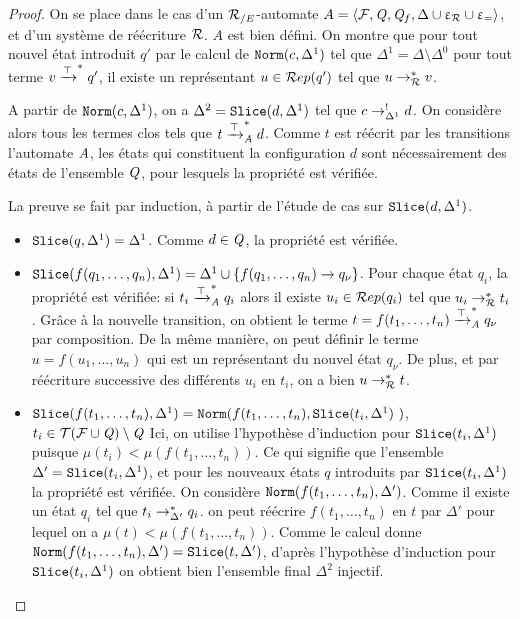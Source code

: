 \begin{proof}
  On se place dans le cas d'un ${\mathcal R_{/E}}$-automate $A = \langle \mathcal{F}, \mathit Q, \mathit Q_f, \Delta \cup \upvarepsilon_{\mathcal R} \cup \upvarepsilon_{=}\rangle$, et d'un système de réécriture $\mathcal R$.
  $A$ est bien défini.
  On montre que pour tout nouvel état introduit $q'$  par le calcul de $\mathtt{Norm}(c, \Delta^1)$ tel que $\Delta^1 = \Delta \setminus \Delta^0$
  pour tout terme $v \xrightarrow{\top}^* q'$, il existe un représentant $u \in \mathcal R ep(q')$ tel que $u \rightarrow^*_\mathcal R v$.

  A partir de $\mathtt{Norm}(c, \Delta^1)$, on a $\Delta^2 = \mathtt{Slice}(d, \Delta^1)$ tel que $c \rightarrow^!_{\Delta^1} d$.
  On considère alors tous les termes clos tels que $t \xrightarrow{\top}^*_\mathit A d$. Comme $t$ est réécrit par les transitions 
  l'automate $\mathit A$, les états qui constituent la configuration $d$ sont nécessairement des états de l'ensemble $\mathit Q$,
  pour lesquels la propriété est vérifiée.
  
  La preuve se fait par induction, à partir de l'étude de cas sur $\mathtt{Slice}(d, \Delta^1)$. 
  \begin{itemize}
  \item $\mathtt{Slice}(q, \Delta^1) = \Delta^1$. Comme $d \in \mathit Q$, la propriété est vérifiée.

  \item $\mathtt{Slice}(f(q_1, \dots, q_n), \Delta^1) = \Delta^1 \cup \{ f(q_1, \dots, q_n) \rightarrow q_\nu\}$. 
    Pour chaque état $q_i$, la propriété est vérifiée: si $t_i \xrightarrow{\top}^*_\mathit A q_i$ alors il existe $u_i \in \mathcal R ep(q_i)$
    tel que $u_i \rightarrow_\mathcal R^* t_i$. Grâce à la nouvelle transition, on obtient le terme $t = f(t_1, \dots, t_n) \xrightarrow{\top}^*_\mathit A q_\nu$ par composition.
    De la même manière, on peut définir le terme $u = f(u_1, \dots, u_n)$ qui est un représentant du nouvel état $q_\nu$.
    De plus, et par réécriture successive des différents $u_i$ en $t_i$, on a bien $u \rightarrow^*_\mathcal R t$.

  \item $\mathtt{Slice}(f(t_1, \dots, t_n), \Delta^1) = \mathtt{Norm}(f(t_1,\dots, t_n), \mathtt{Slice}(t_i, \Delta^1)\ )$, $t_i \in \mathcal{ T(F \cup \mathit Q)} \setminus \mathit Q$
    Ici, on utilise l'hypothèse d'induction pour $\mathtt{Slice}(t_i, \Delta^1)$ puisque $\mu (t_i) < \mu(f(t_1, \dots, t_n))$.
    Ce qui signifie que l'ensemble $\Delta' = \mathtt{Slice}(t_i, \Delta^1)$, et pour les nouveaux états $q$ introduits par $\mathtt{Slice}(t_i, \Delta^1)$
    la propriété est vérifiée.
    On considère $\mathtt{Norm}(f(t_1,\dots, t_n), \Delta')$. Comme il existe un état $q_i$ tel que $t_i \rightarrow^*_{\Delta'} q_i$. on peut 
    réécrire $f(t_1,\dots, t_n)$ en $t$ par $\Delta'$ pour lequel on a $\mu (t) < \mu(f(t_1, \dots, t_n))$. Comme 
    le calcul donne $\mathtt{Norm}(f(t_1,\dots, t_n), \Delta') = \mathtt{Slice}(t, \Delta')$, d'après l'hypothèse d'induction 
    pour $\mathtt{Slice}(t_i, \Delta^1)$ on obtient bien l'ensemble final $\Delta^2$ injectif.
  \end{itemize}
\end{proof}


